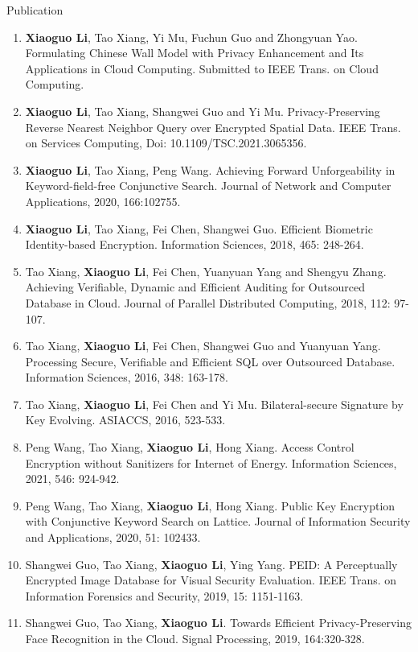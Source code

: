 \documentclass[]{mcdowellcv}
\newcommand{\graycolor}{\textcolor[rgb]{0.3,0.3,0.3}}
\begin{document}
	\begin{cvsection}{\Large Publication}
		\begin{cvsubsection}{}{}{}\graycolor{
			\begin{enumerate}
				\item \textbf{Xiaoguo Li}, Tao Xiang, Yi Mu, Fuchun Guo and Zhongyuan Yao. Formulating Chinese Wall Model with Privacy Enhancement and Its Applications in Cloud Computing. Submitted to IEEE Trans. on Cloud Computing.
				\item \textbf{Xiaoguo Li}, Tao Xiang, Shangwei Guo and Yi Mu. Privacy-Preserving Reverse Nearest Neighbor Query over Encrypted Spatial Data. IEEE Trans. on Services Computing, Doi: 10.1109/TSC.2021.3065356.
				\item \textbf{Xiaoguo Li}, Tao Xiang, Peng Wang. Achieving Forward Unforgeability in Keyword-field-free Conjunctive Search. Journal of Network and Computer Applications, 2020, 166:102755.
				\item \textbf{Xiaoguo Li}, Tao Xiang, Fei Chen, Shangwei Guo. Efficient Biometric Identity-based Encryption. Information Sciences, 2018, 465: 248-264.
				\item Tao Xiang, \textbf{Xiaoguo Li}, Fei Chen, Yuanyuan Yang and Shengyu Zhang. Achieving Verifiable, Dynamic and Efficient Auditing for Outsourced Database in Cloud. Journal of Parallel Distributed Computing, 2018, 112: 97-107.
				\item Tao Xiang, \textbf{Xiaoguo Li}, Fei Chen, Shangwei Guo and Yuanyuan Yang. Processing Secure, Verifiable and Efficient SQL over Outsourced Database. Information Sciences, 2016, 348: 163-178.
				\item Tao Xiang, \textbf{Xiaoguo Li}, Fei Chen and Yi Mu. Bilateral-secure Signature by Key Evolving. ASIACCS, 2016, 523-533.
				\item Peng Wang, Tao Xiang, \textbf{Xiaoguo Li}, Hong Xiang. Access Control Encryption without Sanitizers for Internet of Energy. Information Sciences, 2021, 546: 924-942.
				\item Peng Wang, Tao Xiang, \textbf{Xiaoguo Li}, Hong Xiang. Public Key Encryption with Conjunctive Keyword Search on Lattice. Journal of Information Security and Applications, 2020, 51: 102433.
				\item Shangwei Guo, Tao Xiang, \textbf{Xiaoguo Li}, Ying Yang. PEID: A Perceptually Encrypted Image Database for Visual Security Evaluation. IEEE Trans. on Information Forensics and Security, 2019, 15: 1151-1163.
				\item Shangwei Guo, Tao Xiang, \textbf{Xiaoguo Li}. Towards Efficient Privacy-Preserving Face Recognition in the Cloud. Signal Processing, 2019, 164:320-328.

\end{enumerate}}
\end{cvsubsection}
\end{cvsection}
\end{document}
